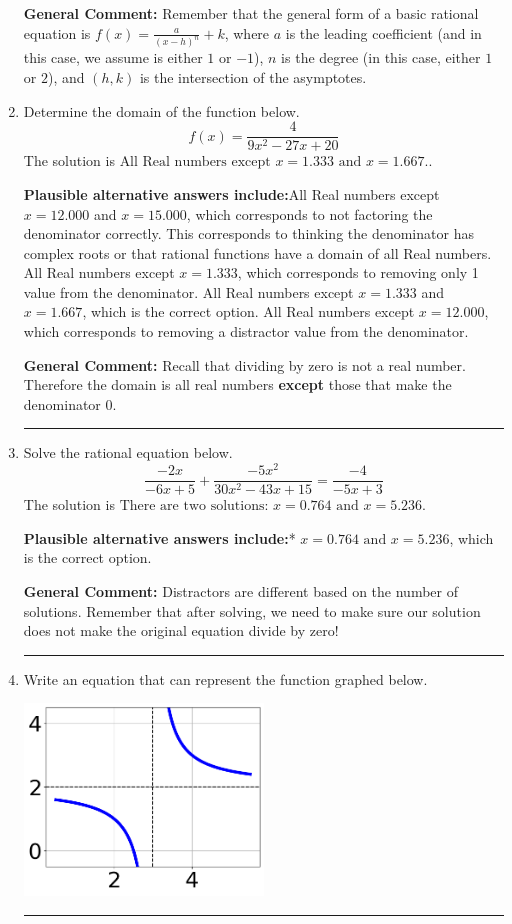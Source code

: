 \documentclass{extbook}[14pt]
\newcommand{\litem}[1]{\item #1

\rule{\textwidth}{0.4pt}}
\begin{document}
\begin{enumerate}
{\textbf{General Comment:} Remember that the general form of a basic rational equation is $ f(x) = \frac{a}{(x-h)^n} + k$, where $a$ is the leading coefficient (and in this case, we assume is either $1$ or $-1$), $n$ is the degree (in this case, either $1$ or $2$), and $(h, k)$ is the intersection of the asymptotes.
}
\litem{
Determine the domain of the function below.
\[ f(x) = \frac{4}{9x^{2} -27 x + 20} \]The solution is \( \text{All Real numbers except } x = 1.333 \text{ and } x = 1.667. \).\begin{enumerate}[label=\Alph*.]
\textbf{Plausible alternative answers include:}All Real numbers except $x = 12.000$ and $x = 15.000$, which corresponds to not factoring the denominator correctly.
This corresponds to thinking the denominator has complex roots or that rational functions have a domain of all Real numbers.
All Real numbers except $x = 1.333$, which corresponds to removing only 1 value from the denominator.
All Real numbers except $x = 1.333$ and $x = 1.667$, which is the correct option.
All Real numbers except $x = 12.000$, which corresponds to removing a distractor value from the denominator.
\end{enumerate}

\textbf{General Comment:} Recall that dividing by zero is not a real number. Therefore the domain is all real numbers \textbf{except} those that make the denominator 0.
}
\litem{
Solve the rational equation below.
\[ \frac{-2x}{-6x + 5} + \frac{-5x^{2}}{30x^{2} -43 x + 15} = \frac{-4}{-5x + 3} \]The solution is \( \text{There are two solutions: } x = 0.764 \text{ and } x = 5.236 \).\begin{enumerate}[label=\Alph*.]
\textbf{Plausible alternative answers include:}* $x = 0.764 \text{ and } x = 5.236$, which is the correct option.




\end{enumerate}

\textbf{General Comment:} Distractors are different based on the number of solutions. Remember that after solving, we need to make sure our solution does not make the original equation divide by zero!
}
\litem{
Write an equation that can represent the function graphed below.

\begin{center}
    \includegraphics[width=0.5\textwidth]{../Figures/rationalGraphToEquationCopyB.png}
\end{center}


}
\end{enumerate}
\end{document}

